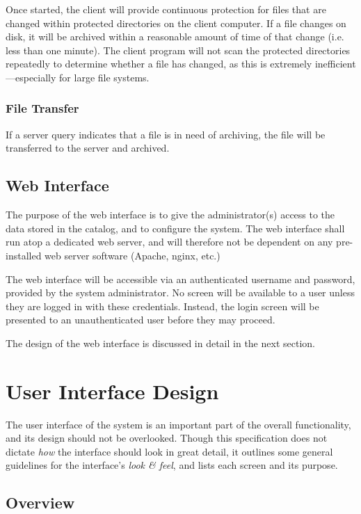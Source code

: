 Once started, the client will provide continuous protection for files that are
changed within protected directories on the client computer. If a file changes
on disk, it will be archived within a reasonable amount of time of that change
(i.e. less than one minute). The client program will not scan the protected
directories repeatedly to determine whether a file has changed, as this is
extremely inefficient---especially for large file systems.

\subsubsection{File Transfer}

If a server query indicates that a file is in need of archiving, the file will
be transferred to the server and archived.

\subsection{Web Interface}

The purpose of the web interface is to give the administrator(s) access to the
data stored in the catalog, and to configure the system. The web interface
shall run atop a dedicated web server, and will therefore not be dependent on
any pre-installed web server software (Apache, nginx, etc.)

The web interface will be accessible via an authenticated username and
password, provided by the system administrator. No screen will be available to
a user unless they are logged in with these credentials. Instead, the login
screen will be presented to an unauthenticated user before they may proceed.

The design of the web interface is discussed in detail in the next section.

\section{User Interface Design}

The user interface of the system is an important part of the overall
functionality, and its design should not be overlooked. Though this
specification does not dictate \emph{how} the interface should look in great
detail, it outlines some general guidelines for the interface's \emph{look \&
feel}, and lists each screen and its purpose.

\subsection{Overview}

